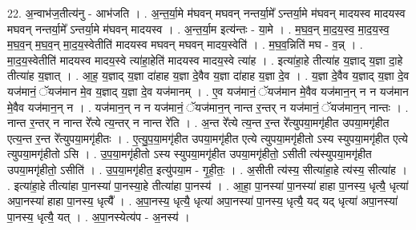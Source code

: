 \documentclass[17pt]{extarticle}
\begin{document}
22. अ॒न्वाभ॑ज॒तीत्य॑नु - आभ॑जति । . अ॒न्त॒र्या॒मे म॑घवन् मघवन् नन्तर्या॒मे᳚ ऽन्तर्या॒मे म॑घवन् मादयस्व मादयस्व मघवन् नन्तर्या॒मे᳚ ऽन्तर्या॒मे म॑घवन् मादयस्व । . अ॒न्त॒र्या॒म इत्य॑न्तः - या॒मे । . म॒घ॒व॒न् मा॒द॒य॒स्व॒ मा॒द॒य॒स्व॒ म॒घ॒व॒न् म॒घ॒व॒न् मा॒द॒य॒स्वेतीति॑ मादयस्व मघवन् मघवन् मादय॒स्वेति॑ । . म॒घ॒व॒न्निति॑ मघ - व॒न्न् । . मा॒द॒य॒स्वेतीति॑ मादयस्व मादय॒स्वे त्या॑हा॒हेति॑ मादयस्व मादय॒स्वे त्या॑ह । . इत्या॑हा॒हे तीत्या॑ह य॒ज्ञाद् य॒ज्ञा दा॒हे तीत्या॑ह य॒ज्ञात् । . आ॒ह॒ य॒ज्ञाद् य॒ज्ञा दा॑हाह य॒ज्ञा दे॒वैव य॒ज्ञा दा॑हाह य॒ज्ञा दे॒व । . य॒ज्ञा दे॒वैव य॒ज्ञाद् य॒ज्ञा दे॒व यज॑मानं॒ ॅयज॑मान मे॒व य॒ज्ञाद् य॒ज्ञा दे॒व यज॑मानम् । . ए॒व यज॑मानं॒ ॅयज॑मान मे॒वैव यज॑मान॒न् न न यज॑मान मे॒वैव यज॑मान॒न् न । . यज॑मान॒न् न न यज॑मानं॒ ॅयज॑मान॒न् नान्त र॒न्तर् न यज॑मानं॒ ॅयज॑मान॒न् नान्तः । . नान्त र॒न्तर् न नान्त रे᳚त्ये त्य॒न्तर् न नान्त रे॑ति । . अ॒न्त रे᳚त्ये त्य॒न्त र॒न्त रे᳚त्युपया॒मगृ॑हीत उपया॒मगृ॑हीत एत्य॒न्त र॒न्त रे᳚त्युपया॒मगृ॑हीतः । . ए॒त्यु॒प॒या॒मगृ॑हीत उपया॒मगृ॑हीत एत्ये त्युपया॒मगृ॑हीतो ऽस्य स्युपया॒मगृ॑हीत एत्ये त्युपया॒मगृ॑हीतो ऽसि । . उ॒प॒या॒मगृ॑हीतो ऽस्य स्युपया॒मगृ॑हीत उपया॒मगृ॑हीतो॒ ऽसीती त्य॑स्युपया॒मगृ॑हीत उपया॒मगृ॑हीतो॒ ऽसीति॑ । . उ॒प॒या॒मगृ॑हीत॒ इत्यु॑पया॒म - गृ॒ही॒तः॒ । . अ॒सीती त्य॑स्य॒ सीत्या॑हा॒हे त्य॑स्य॒ सीत्या॑ह । . इत्या॑हा॒हे तीत्या॑हा पा॒नस्या॑ पा॒नस्या॒हे तीत्या॑हा पा॒नस्य॑ । . आ॒हा॒ पा॒नस्या॑ पा॒नस्या॑ हाहा पा॒नस्य॒ धृत्यै॒ धृत्या॑ अपा॒नस्या॑ हाहा पा॒नस्य॒ धृत्यै᳚ । . अ॒पा॒नस्य॒ धृत्यै॒ धृत्या॑ अपा॒नस्या॑ पा॒नस्य॒ धृत्यै॒ यद् यद् धृत्या॑ अपा॒नस्या॑ पा॒नस्य॒ धृत्यै॒ यत् । . अ॒पा॒नस्येत्य॑प - अ॒नस्य॑ । \newline
\end{document}
